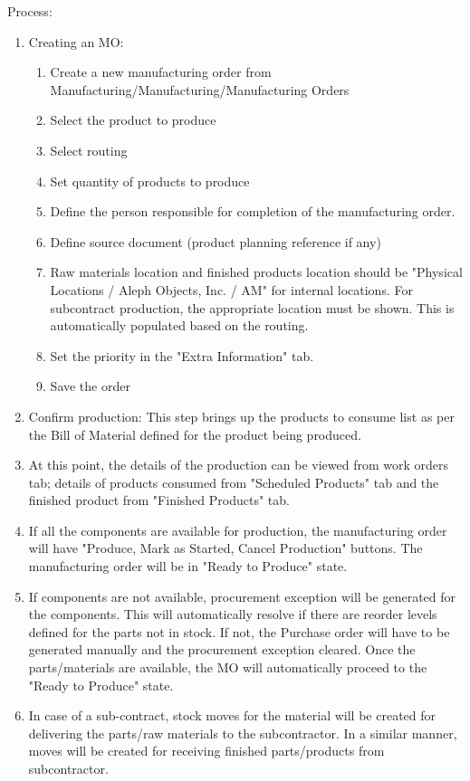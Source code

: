 Process:

\begin{enumerate}
\item Creating an MO: 
  \begin{enumerate}
  \item Create a new manufacturing order from Manufacturing/Manufacturing/Manufacturing Orders
  \item Select the product to produce
  \item Select routing
  \item Set quantity of products to produce
  \item Define the person responsible for completion of the manufacturing order.
  \item Define source document (product planning reference if any)
  \item Raw materials location and finished products location should be "Physical Locations / Aleph Objects, Inc. / AM" for internal locations. For subcontract production, the appropriate location must be shown. This is automatically populated based on the routing.
  \item Set the priority in the "Extra Information" tab.
  \item Save the order
  \end{enumerate}
\item Confirm production: This step brings up the products to consume list as per the Bill of Material defined for the product being produced.
\item At this point, the details of the production can be viewed from work orders tab; details of products consumed from "Scheduled Products" tab and the finished product from "Finished Products" tab.
\item If all the components are available for production, the manufacturing order will have "Produce, Mark as Started, Cancel Production" buttons. The manufacturing order will be in "Ready to Produce" state.
\item If components are not available, procurement exception will be generated for the components. This will automatically resolve if there are reorder levels defined for the parts not in stock. If not, the Purchase order will have to be generated manually and the procurement exception cleared. Once the parts/materials are available, the MO will automatically proceed to the "Ready to Produce" state.
\item In case of a sub-contract, stock moves for the material will be created for delivering the parts/raw materials to the subcontractor. In a similar manner, moves will be created for receiving finished parts/products from subcontractor.

\end{enumerate}
